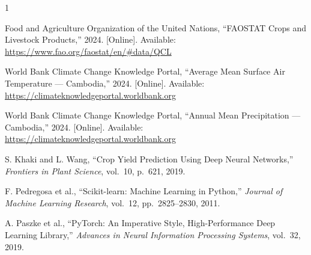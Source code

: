 \documentclass[conference]{IEEEtran}
\begin{document}
\begin{thebibliography}{1}

Food and Agriculture Organization of the United Nations, ``FAOSTAT Crops and Livestock Products,'' 2024. [Online]. Available: \url{https://www.fao.org/faostat/en/#data/QCL}

World Bank Climate Change Knowledge Portal, ``Average Mean Surface Air Temperature --- Cambodia,'' 2024. [Online]. Available: \url{https://climateknowledgeportal.worldbank.org}

World Bank Climate Change Knowledge Portal, ``Annual Mean Precipitation --- Cambodia,'' 2024. [Online]. Available: \url{https://climateknowledgeportal.worldbank.org}

S. Khaki and L. Wang, ``Crop Yield Prediction Using Deep Neural Networks,'' \textit{Frontiers in Plant Science}, vol.~10, p.~621, 2019.

F. Pedregosa et al., ``Scikit-learn: Machine Learning in Python,'' \textit{Journal of Machine Learning Research}, vol.~12, pp.~2825--2830, 2011.

A. Paszke et al., ``PyTorch: An Imperative Style, High-Performance Deep Learning Library,'' \textit{Advances in Neural Information Processing Systems}, vol.~32, 2019.

\end{thebibliography}
\end{document}
